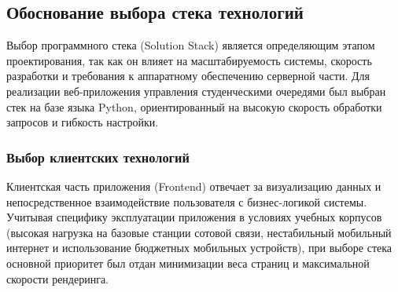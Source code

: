 \subsection{Обоснование выбора стека технологий}

Выбор программного стека (Solution Stack) является определяющим 
этапом проектирования, так как он влияет на масштабируемость системы, скорость разработки 
и требования к аппаратному обеспечению серверной части. Для реализации веб-приложения управления 
студенческими очередями был выбран стек на базе языка Python, ориентированный на высокую скорость 
обработки запросов и гибкость настройки.

\subsubsection{Выбор клиентских технологий}

Клиентская часть приложения (Frontend) отвечает за визуализацию данных и непосредственное взаимодействие 
пользователя с бизнес-логикой системы. Учитывая специфику эксплуатации приложения в условиях учебных корпусов 
(высокая нагрузка на базовые станции сотовой связи, нестабильный мобильный интернет и использование бюджетных 
мобильных устройств), при выборе стека основной приоритет был отдан минимизации веса страниц и максимальной 
скорости рендеринга.

